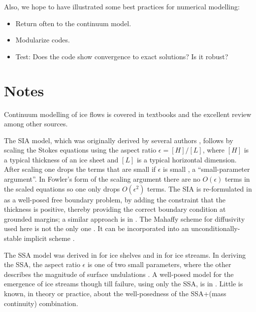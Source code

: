 \documentclass[letterpaper,final,12pt,reqno]{amsart}
\newcommand{\eps}{\epsilon}
\begin{document}
Also, we hope to have illustrated some best practices for numerical modelling:
\begin{itemize}
\item Return often to the continuum model.
\item Modularize codes.
\item Test:  Does the code show convergence to exact solutions?  Is it robust?
\end{itemize}


\section{Notes} \label{sec:nr}

Continuum modelling of ice flows is covered in textbooks \cite{CuffeyPaterson,GreveBlatter2009,vanderVeen} and the excellent review \cite{SchoofHewitt2013} among other sources.

The SIA model, which was originally derived by several authors \cite{FowlerLarson1978,Hutter,MorlandJohnson}, follows by scaling the Stokes equations using the aspect ratio $\eps = [H]/[L]$, where $[H]$ is a typical thickness of an ice sheet and $[L]$ is a typical horizontal dimension.  After scaling one drops the terms that are small if $\eps$ is small \cite{Fowler,Hutter}, a ``small-parameter argument''.  In Fowler's form of the scaling argument \cite{Fowler} there are no $O(\eps)$ terms in the scaled equations so one only drops $O(\eps^2)$ terms.  The SIA is re-formulated in \cite{JouvetBueler2012} as a well-posed free boundary problem, by adding the constraint that the thickness is positive, thereby providing the correct boundary condition at grounded margins; a similar approach is in \cite{Bueler2016}.  The Mahaffy \cite{Mahaffy} scheme for diffusivity used here is not the only one \cite{HindmarshPayne}.  It can be incorporated into an unconditionally-stable implicit scheme \cite{Bueler2016}.

The SSA model \cite{WeisGreveHutter} was derived in \cite{Morland} for ice shelves and in \cite{MacAyeal} for ice streams.  In deriving the SSA, the aspect ratio $\eps$ is one of two small parameters, where the other describes the magnitude of surface undulations \cite{SchoofStream,SchoofHindmarsh}.  A well-posed model for the emergence of ice streams though till failure, using only the SSA, is in \cite{SchoofStream}.  Little is known, in theory or practice, about the well-posedness of the SSA+(mass continuity) combination.
\end{document}
